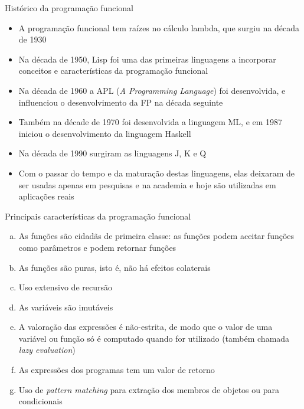 \begin{frame}[fragile]{Histórico da programação funcional}

    \begin{itemize}
        \item A programação funcional tem raízes no cálculo lambda, que surgiu na década de 1930

        \item Na década de 1950, Lisp foi uma das primeiras linguagens a incorporar conceitos e
            características da programação funcional

        \item Na década de 1960 a APL (\textit{A Programming Language}) foi desenvolvida, e 
            influenciou o desenvolvimento da FP na década seguinte

        \item Também na décade de 1970 foi desenvolvida a linguagem ML, e em 1987 iniciou o
            desenvolvimento da linguagem Haskell

        \item Na década de 1990 surgiram as linguagens J, K e Q

        \item Com o passar do tempo e da maturação destas linguagens, elas deixaram de ser usadas
            apenas em pesquisas e na academia e hoje são utilizadas em aplicações reais
    \end{itemize}

\end{frame}

\begin{frame}[fragile]{Principais características da programação funcional}

    \begin{enumerate}[(a)]
        \item As funções são cidadãs de primeira classe: as funções podem aceitar funções
            como parâmetros e podem retornar funções

        \item As funções são puras, isto é, não há efeitos colaterais

        \item Uso extensivo de recursão

        \item As variáveis são imutáveis

        \item A valoração das expressões é não-estrita, de modo que o valor de uma variável ou
            função só é computado quando for utilizado (também chamada \textit{lazy evaluation})

        \item As expressões dos programas tem um valor de retorno 

        \item Uso de \textit{pattern matching} para extração dos membros de objetos ou para
            condicionais
    \end{enumerate}

\end{frame}

